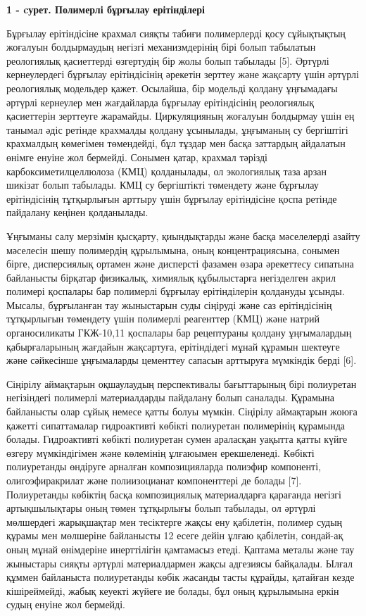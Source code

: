 {\bfseries 1 - cурет. Полимерлі бұрғылау ерітінділері} %

\begin{multicols}{2}
Бұрғылау ерітіндісіне крахмал сияқты табиғи полимерлерді қосу
сұйықтықтың жоғалуын болдырмаудың негізгі механизмдерінің бірі болып
табылатын реологиялық қасиеттерді өзгертудің бір жолы болып табылады
{[}5{]}. Әртүрлі кернеулердегі бұрғылау ерітіндісінің әрекетін зерттеу
және жақсарту үшін әртүрлі реологиялық модельдер қажет. Осылайша, бір
модельді қолдану ұңғымадағы әртүрлі кернеулер мен жағдайларда бұрғылау
ерітіндісінің реологиялық қасиеттерін зерттеуге жарамайды. Циркуляцияның
жоғалуын болдырмау үшін ең танымал әдіс ретінде крахмалды қолдану
ұсынылады, ұңғыманың су бергіштігі крахмалдың көмегімен төмендейді, бұл
тұздар мен басқа заттардың айдалатын өнімге енуіне жол бермейді. Сонымен
қатар, крахмал тәрізді карбоксиметилцеллюлоза (КМЦ) қолданылады, ол
экологиялық таза арзан шикізат болып табылады. КМЦ су бергіштікті
төмендету және бұрғылау ерітіндісінің тұтқырлығын арттыру үшін бұрғылау
ерітіндісіне қоспа ретінде пайдалану кеңінен қолданылады.

Ұңғыманы салу мерзімін қысқарту, қиындықтарды және басқа мәселелерді
азайту мәселесін шешу полимердің құрылымына, оның концентрациясына,
сонымен бірге, дисперсиялық ортамен және дисперсті фазамен өзара
әрекеттесу сипатына байланысты бірқатар физикалық, химиялық құбылыстарға
негізделген акрил полимері қоспалары бар полимерлі бұрғылау
ерітінділерін қолдануды ұсынды. Мысалы, бұрғыланған тау жыныстарын суды
сіңіруді және саз ерітіндісінің тұтқырлығын төмендету үшін полимерлі
реагенттер (КМЦ) және натрий органосиликаты ГКЖ-10,11 қоспалары бар
рецептураны қолдану ұңғымалардың қабырғаларының жағдайын жақсартуға,
ерітіндідегі мұнай құрамын шектеуге және сәйкесінше ұңғымаларды
цементтеу сапасын арттыруға мүмкіндік берді {[}6{]}.

Сіңірілу аймақтарын оқшаулаудың перспективалы бағыттарының бірі
полиуретан негізіндегі полимерлі материалдарды пайдалану болып саналады.
Құрамына байланысты олар сұйық немесе қатты болуы мүмкін. Сіңірілу
аймақтарын жоюға қажетті сипаттамалар гидроактивті көбікті полиуретан
полимерінің құрамында болады. Гидроактивті көбікті полиуретан сумен
араласқан уақытта қатты күйге өзгеру мүмкіндігімен және көлемінің
ұлғаюымен ерекшеленеді. Көбікті полиуретанды өндіруге арналған
композицияларда полиэфир компоненті, олигоэфиракрилат және полиизоцианат
компоненттері де болады {[}7{]}. Полиуретанды көбіктің басқа
композициялық материалдарға қарағанда негізгі артықшылықтары оның төмен
тұтқырлығы болып табылады, ол әртүрлі мөлшердегі жарықшақтар мен
тесіктерге жақсы ену қабілетін, полимер судың құрамы мен мөлшеріне
байланысты 12 есеге дейін ұлғаю қабілетін, сондай-ақ оның мұнай
өнімдеріне инерттілігін қамтамасыз етеді. Қаптама металы және тау
жыныстары сияқты әртүрлі материалдармен жақсы адгезиясы байқалады. Ылғал
құммен байланыста полиуретанды көбік жасанды тасты құрайды, қатайған
кезде кішіреймейді, жабық кеуекті жүйеге ие болады, бұл оның құрылымына
еркін судың енуіне жол бермейді.


\end{multicols}

